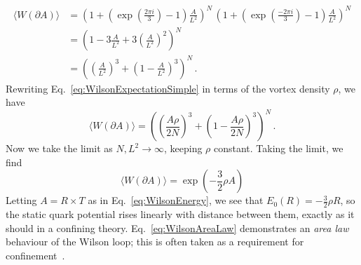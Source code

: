 %
\begin{align}
\langle W(\partial A)\rangle &=\left(1+\left(\exp\left(\frac{2\pi i}{3}\right) - 1\right)\frac{A}{L^2}\right)^N\, \left(1+\left(\exp\left(\frac{-2\pi i}{3}\right) - 1\right)\frac{A}{L^2}\right)^N\nonumber\\
&=\left(1 -3\frac{A}{L^2} + 3\left(\frac{A}{L^2}\right)^2\right)^N\nonumber\\
&= \left(\left(\frac{A}{L^2}\right)^3+\left(1-\frac{A}{L^2}\right)^3\right)^N\, .\label{eq:WilsonExpectationSimple}
\end{align}
%
Rewriting Eq.~\ref{eq:WilsonExpectationSimple} in terms of the vortex density $\rho$, we have
%
\begin{equation}
\langle W(\partial A)\rangle = \left(\left(\frac{A\rho}{2N}\right)^3+\left(1-\frac{A\rho}{2N}\right)^3\right)^N\, .
\end{equation}
%
Now we take the limit as $N,L^2\rightarrow\infty$, keeping $\rho$ constant. Taking the limit, we find
%
\begin{equation}
\langle W(\partial A)\rangle = \exp\left(-\frac{3}{2}\rho A\right)
\label{eq:WilsonAreaLaw}
\end{equation}
%
Letting $A=R\times T$ as in Eq.~\ref{eq:WilsonEnergy}, we see that $E_0(R) = -\frac{3}{2}\rho R$, so the static quark potential rises linearly with distance between them, exactly as it should in a confining theory. Eq.~\ref{eq:WilsonAreaLaw} demonstrates an {\it area law} behaviour of the Wilson loop; this is often taken as a requirement for confinement~\cite{DelDebbio:1998luz,Dosch:1988ha}.\\

